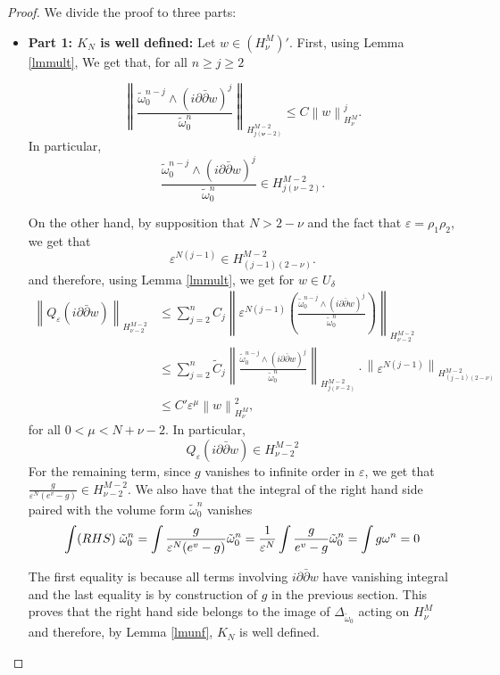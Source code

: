 \documentclass[a4paper,11pt]{article}
\begin{document}
\begin{proof} We divide the proof to three parts: 
\begin{itemize}
    \item \textbf{Part 1: $K_N$ is well defined:}
    Let $w \in \left(H_{ \nu}^M \right)' $. First, using Lemma \ref{lmmult}, We get that, for all $n \geq j \geq 2$ 
    
    $$ \left\| \frac{\tilde \omega_0^{n-j} \wedge(i \partial \bar{\partial}  w)^j}{\tilde \omega_0^{n}} \right\|_{H_{ j \left(\boldsymbol{\nu} - 2 \right)}^{M -2}} \leq C \left\| 
 w \right\|_{H_{\nu}^{M}}^{j}.$$ 
 In particular, 
 $$
 \frac{\tilde \omega_0^{n-j} \wedge(i \partial \bar{\partial}  w)^j}{\tilde \omega_0^{n}} \in H_{ j \left(\nu - 2 \right)}^{M -2}.
 $$
    
    On the other hand, by supposition that $N > 2 - \nu$ and the fact that $\varepsilon = \rho_1 \rho_2$, we get that
$$
\varepsilon^{N(j-1)} \in {H_{ (j-1) \left( 2 - \nu \right) }^{M -2}}. 
$$
and therefore, using Lemma \ref{lmmult}, we get for $w \in U_{\delta}$
\begin{align*}
\left\| Q_{\varepsilon} (i \partial \bar \partial w) \right\|_{H_{  \nu - 2 }^{M -2}} & \leq \sum_{j=2}^{n} C_{j}
\left\| \varepsilon^{N(j-1)} \left( \frac{\tilde \omega_0^{n-j} \wedge(i \partial \bar{\partial}  w)^j}{\tilde \omega_0^{n}}\right)  \right\|_{H_{  \nu - 2 }^{M -2}} \\ & \leq \sum_{j=2}^{n} \tilde C_{j} \left\| \frac{\tilde \omega_0^{n-j} \wedge(i \partial \bar{\partial}  w)^j}{\tilde \omega_0^{n}}\right\|_{H_{ j \left(  \nu - 2 \right) }^{M -2}} \cdot \left\| \varepsilon^{N(j-1)} \right\|_{H_{ (j-1) \left( 2 - \nu \right) }^{M -2}} \\ & \leq C' \varepsilon^{\mu} \left\| w \right\|_{H_{\nu }^{M}}^2,
\end{align*}
for all $0<\mu < N + \nu -2$. In particular, 
    $$ Q_{\varepsilon} (i \partial \bar \partial w) \in H_{\nu - 2 }^{M -2}$$
    For the remaining term, since $g$ vanishes to infinite order in $\varepsilon$, we get that $\frac{g}{\varepsilon^N (e^{v} - g)} \in H_{  \nu - 2 }^{M -2}$. We also have that the integral of the right hand side paired with the volume form $\tilde \omega_0^n$ vanishes 
    $$ 
    \int (RHS) \hspace{0.1cm} \tilde \omega_0^n =  \int \frac{g}{\varepsilon^N (e^{v} - g)} \tilde \omega_0^n = \frac{1}{\varepsilon^N} \int \frac{g}{e^{v} - g} \tilde \omega_0^n = \int g \omega^n = 0
    $$
    
    The first equality is because all terms involving $i \partial \bar \partial w$ have vanishing integral and the last equality is by construction of $g$ in the previous section. This proves that the right hand side belongs to the image of $\Delta_{\tilde \omega_0}$ acting on $H_{ \nu}^M$ and therefore, by Lemma \ref{lmunf},  $K_{N}$ is well defined.    


\end{itemize}
\end{proof}
\end{document}
